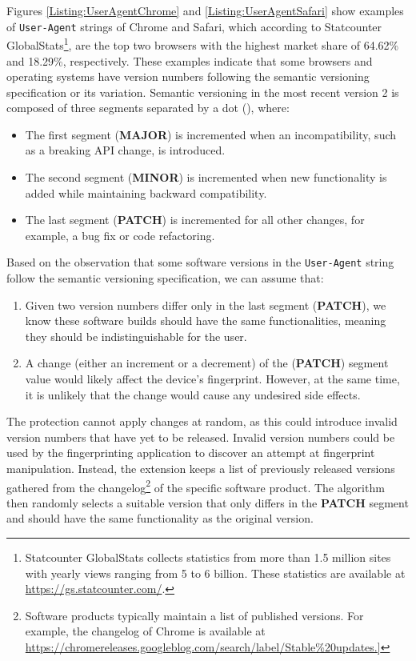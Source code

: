 Figures \ref{Listing:UserAgentChrome} and \ref{Listing:UserAgentSafari} show examples of \texttt{User-Agent} strings of Chrome and Safari, which according to Statcounter GlobalStats\footnote{Statcounter GlobalStats collects statistics from more than 1.5 million sites with yearly views ranging from 5 to 6 billion. These statistics are available at \url{https://gs.statcounter.com/}.}, are the top two browsers with the highest market share of 64.62\% and 18.29\%, respectively. These examples indicate that some browsers and operating systems have version numbers following the semantic versioning specification\cite{SemVerWebsite} or its variation. Semantic versioning in the most recent version 2 is composed of three segments separated by a dot (), where:

\begin{itemize}
	\item The first segment (\textbf{MAJOR}) is incremented when an incompatibility, such as a breaking API change, is introduced.
	\item The second segment (\textbf{MINOR}) is incremented when new functionality is added while maintaining backward compatibility.
	\item The last segment (\textbf{PATCH}) is incremented for all other changes, for example, a bug fix or code refactoring.
\end{itemize}

Based on the observation that some software versions in the \texttt{User-Agent} string follow the semantic versioning specification, we can assume that:

\begin{enumerate}
	\item Given two version numbers differ only in the last segment (\textbf{PATCH}), we know these software builds should have the same functionalities, meaning they should be indistinguishable for the user.
	\item A change (either an increment or a decrement) of the (\textbf{PATCH}) segment value would likely affect the device's fingerprint. However, at the same time, it is unlikely that the change would cause any undesired side effects.
\end{enumerate}

The protection cannot apply changes at random, as this could introduce invalid version numbers that have yet to be released. Invalid version numbers could be used by the fingerprinting application to discover an attempt at fingerprint manipulation. Instead, the extension keeps a list of previously released versions gathered from the changelog\footnote{Software products typically maintain a list of published versions. For example, the changelog of Chrome is available at \url{https://chromereleases.googleblog.com/search/label/Stable\%20updates.]}} of the specific software product. The algorithm then randomly selects a suitable version that only differs in the \textbf{PATCH} segment and should have the same functionality as the original version.

